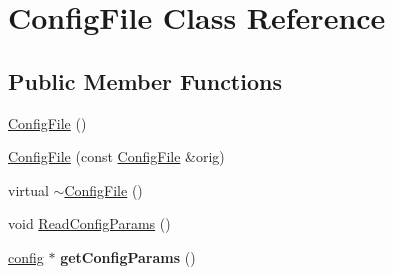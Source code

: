 \hypertarget{classConfigFile}{\section{Config\-File Class Reference}
\label{classConfigFile}
}
\subsection*{Public Member Functions}
\begin{DoxyCompactItemize}
\item 
\hyperlink{classConfigFile_a9ce259defdfaabeedb2455849ca6bd1e}{Config\-File} ()
\item 
\hyperlink{classConfigFile_ab5c5ee702366f5f4c8833bfe58dfe306}{Config\-File} (const \hyperlink{classConfigFile}{Config\-File} \&orig)
\item 
virtual \hyperlink{classConfigFile_ae73765f7f0320bb6422da1cebe866f31}{$\sim$\-Config\-File} ()
\item 
void \hyperlink{classConfigFile_a525b771d6c5df54fe40c0d4aedeeaf02}{Read\-Config\-Params} ()
\item 
\hypertarget{classConfigFile_aa12085de76fa6eabef7d0d23938a4279}{\hyperlink{structconfig}{config} $\ast$ {\bfseries get\-Config\-Params} ()}\label{classConfigFile_aa12085de76fa6eabef7d0d23938a4279}

\end{DoxyCompactItemize}



